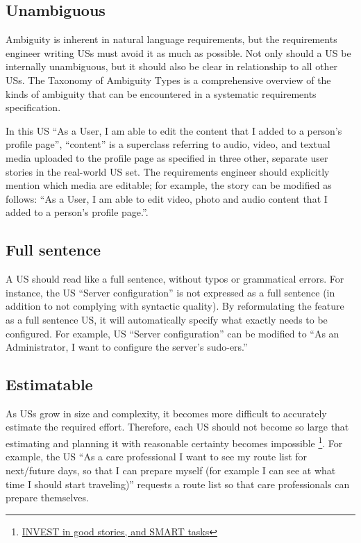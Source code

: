 \subsection*{\normalsize{Unambiguous}}
Ambiguity is inherent in natural language requirements, but the requirements engineer writing USs must avoid it as much as possible. Not only should a US be internally unambiguous, but it should also be clear in relationship to all other USs. The Taxonomy of Ambiguity Types \cite{berry2004ambiguity} is a comprehensive overview of the kinds of ambiguity that can be encountered in a systematic requirements specification.

In this US \enquote{As a User, I am able to edit the content that I added to a person's profile page}, \enquote{content} is a superclass referring to audio, video, and textual media uploaded to the profile page as specified in three other, separate user stories in the real-world US set. The requirements engineer should explicitly mention which media are editable; for example, the story can be modified as follows: \enquote{As a User, I am able to edit video, photo and audio content that I added to a person’s profile page.}.
\subsection*{\normalsize{Full sentence}}
A US should read like a full sentence, without typos or grammatical errors. For instance, the US \enquote{Server configuration} is not expressed as a full sentence (in addition to not complying with syntactic quality). By reformulating the feature as a full sentence US, it will automatically specify what exactly needs to be configured. For example, US \enquote{Server configuration} can be modified to \enquote{As an Administrator, I want to configure the server’s sudo-ers.}
\subsection*{\normalsize{Estimatable}}
As USs grow in size and complexity, it becomes more difficult to accurately estimate the required effort. Therefore, each US should not become so large that estimating and planning it with reasonable certainty becomes impossible \footnote{\href{http://xp123.com/articles/invest-in-good-stories-and-smart-tasks/. Accessed 2015-02-18}{INVEST in good stories, and SMART tasks}}. For example, the US \enquote{As a care professional I want to see my route list for next/future days, so that I can prepare myself (for example I can see at what time I should start traveling)} requests a route list so that care professionals can prepare themselves. 


